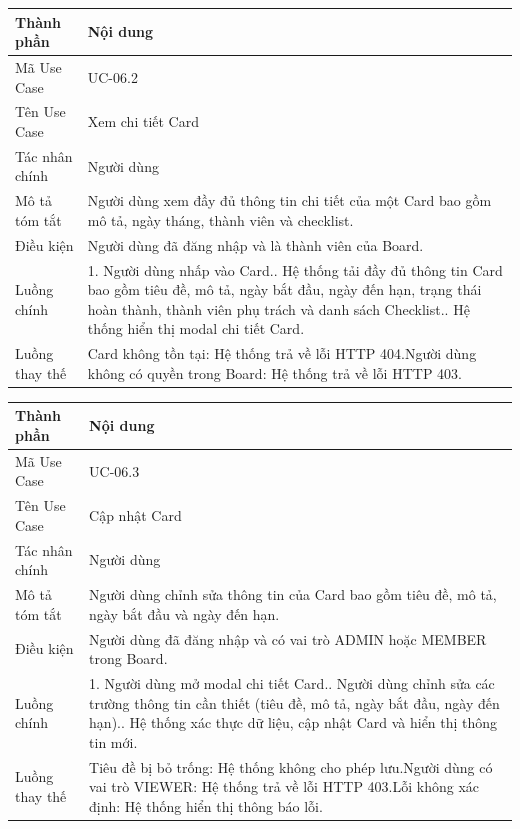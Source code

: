 \vspace{0.5cm}
\noindent\begin{tabular}{|p{3.5cm}|p{10.5cm}|}
\hline
\textbf{Thành phần} & \textbf{Nội dung} \\
\hline
Mã Use Case & UC-06.2 \\
\hline
Tên Use Case & Xem chi tiết Card \\
\hline
Tác nhân chính & Người dùng \\
\hline
Mô tả tóm tắt & Người dùng xem đầy đủ thông tin chi tiết của một Card bao gồm mô tả, ngày tháng, thành viên và checklist. \\
\hline
Điều kiện & Người dùng đã đăng nhập và là thành viên của Board. \\
\hline
Luồng chính & 1. Người dùng nhấp vào Card.\newline 2. Hệ thống tải đầy đủ thông tin Card bao gồm tiêu đề, mô tả, ngày bắt đầu, ngày đến hạn, trạng thái hoàn thành, thành viên phụ trách và danh sách Checklist.\newline 3. Hệ thống hiển thị modal chi tiết Card. \\
\hline
Luồng thay thế & Card không tồn tại: Hệ thống trả về lỗi HTTP 404.\newline Người dùng không có quyền trong Board: Hệ thống trả về lỗi HTTP 403. \\
\hline
\end{tabular}

\vspace{0.5cm}
\noindent\begin{tabular}{|p{3.5cm}|p{10.5cm}|}
\hline
\textbf{Thành phần} & \textbf{Nội dung} \\
\hline
Mã Use Case & UC-06.3 \\
\hline
Tên Use Case & Cập nhật Card \\
\hline
Tác nhân chính & Người dùng \\
\hline
Mô tả tóm tắt & Người dùng chỉnh sửa thông tin của Card bao gồm tiêu đề, mô tả, ngày bắt đầu và ngày đến hạn. \\
\hline
Điều kiện & Người dùng đã đăng nhập và có vai trò ADMIN hoặc MEMBER trong Board. \\
\hline
Luồng chính & 1. Người dùng mở modal chi tiết Card.\newline 2. Người dùng chỉnh sửa các trường thông tin cần thiết (tiêu đề, mô tả, ngày bắt đầu, ngày đến hạn).\newline 3. Hệ thống xác thực dữ liệu, cập nhật Card và hiển thị thông tin mới. \\
\hline
Luồng thay thế & Tiêu đề bị bỏ trống: Hệ thống không cho phép lưu.\newline Người dùng có vai trò VIEWER: Hệ thống trả về lỗi HTTP 403.\newline Lỗi không xác định: Hệ thống hiển thị thông báo lỗi. \\
\hline
\end{tabular}

